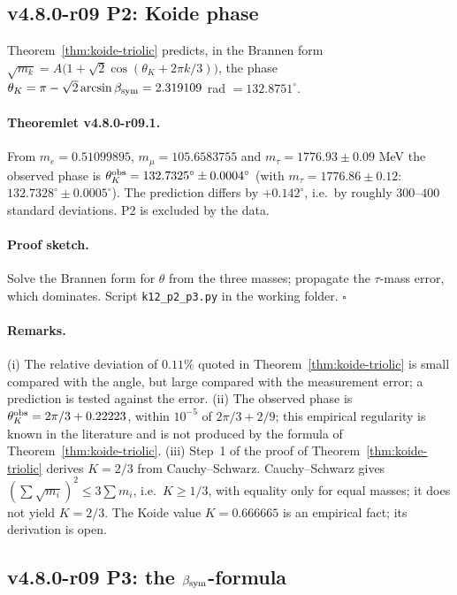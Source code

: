\subsection*{v4.8.0-r09 P2: Koide phase}
\label{subsec:v480-r09-p2}

Theorem~\ref{thm:koide-triolic} predicts, in the Brannen form
\(\sqrt{m_k}=A\bigl(1+\sqrt2\cos(\theta_K+2\pi k/3)\bigr)\), the phase
\(\theta_K=\pi-\sqrt2\arcsin\beta_{\mathrm{sym}}=2.319109\) rad \(=132.8751^\circ\).

\paragraph{Theoremlet v4.8.0-r09.1.}
From \(m_e=0.51099895\), \(m_\mu=105.6583755\) and \(m_\tau=1776.93\pm0.09\) MeV the observed phase is
\(\theta_K^{\rm obs}=132.7325^\circ\pm0.0004^\circ\) (with \(m_\tau=1776.86\pm0.12\):
\(132.7328^\circ\pm0.0005^\circ\)).  The prediction differs by \(+0.142^\circ\), i.e.\ by roughly
\(300\)--\(400\) standard deviations.  P2 is excluded by the data.

\paragraph{Proof sketch.}
Solve the Brannen form for \(\theta\) from the three masses; propagate the \(\tau\)-mass error, which
dominates.  Script \texttt{k12\_p2\_p3.py} in the working folder.  \(\square\)

\paragraph{Remarks.}
(i) The relative deviation of \(0.11\%\) quoted in Theorem~\ref{thm:koide-triolic} is small compared with
the angle, but large compared with the measurement error; a prediction is tested against the error.
(ii) The observed phase is \(\theta_K^{\rm obs}=2\pi/3+0.22223\), within \(10^{-5}\) of
\(2\pi/3+2/9\); this empirical regularity is known in the literature and is not produced by the formula
of Theorem~\ref{thm:koide-triolic}.
(iii) Step~1 of the proof of Theorem~\ref{thm:koide-triolic} derives \(K=2/3\) from Cauchy--Schwarz.
Cauchy--Schwarz gives \((\sum\sqrt{m_i})^2\le3\sum m_i\), i.e.\ \(K\ge1/3\), with equality only for equal
masses; it does not yield \(K=2/3\).  The Koide value \(K=0.666665\) is an empirical fact; its derivation
is open.

\subsection*{v4.8.0-r09 P3: the \texorpdfstring{$\beta_{\mathrm{sym}}$}{beta}-formula}
\label{subsec:v480-r09-p3}

